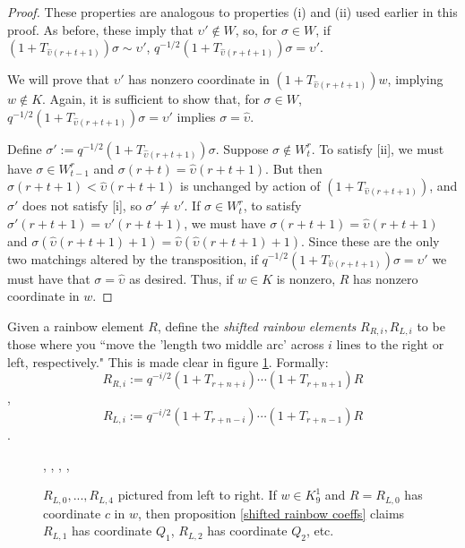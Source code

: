 \documentclass{amsart}
\begin{document}
\begin{proof}
	These properties are analogous to properties (i) and (ii) used earlier in this proof. As before, these imply that $\upsilon'\not\in W$, so, for $\sigma\in W$, if $(1+T_{\widehat{\upsilon}(r+t+1)})\sigma\sim \upsilon'$, $q^{-1/2}(1+T_{\widehat{\upsilon}(r+t+1)})\sigma=\upsilon'$.
	
	We will prove that $\upsilon'$ has nonzero coordinate in $(1+T_{\widehat{\upsilon}(r+t+1)})w$, implying $w\not\in K$. Again, it is sufficient to show that, for $\sigma\in W$, $q^{-1/2}(1+T_{\widehat{\upsilon}(r+t+1)})\sigma=\upsilon'$ implies $\sigma=\widehat{\upsilon}$.
	
	Define $\sigma':=q^{-1/2}(1+T_{\widehat{\upsilon}(r+t+1)})\sigma$. Suppose $\sigma\not\in W^r_t$. To satisfy [ii], we must have $\sigma\in W^r_{t-1}$ and $\sigma(r+t)=\widehat{\upsilon}(r+t+1)$. But then $\sigma(r+t+1)<\widehat{\upsilon}(r+t+1)$ is unchanged by action of $(1+T_{\widehat{\upsilon}(r+t+1)})$, and $\sigma'$ does not satisfy [i], so $\sigma'\not=\upsilon'$. If $\sigma\in W^r_t$, to satisfy $\sigma'(r+t+1)=\upsilon'(r+t+1)$, we must have $\sigma(r+t+1)=\widehat{\upsilon}(r+t+1)$ and $\sigma(\widehat{\upsilon}(r+t+1)+1)=\widehat{\upsilon}(\widehat{\upsilon}(r+t+1)+1)$. Since these are the only two matchings altered by the transposition, if $q^{-1/2}(1+T_{\widehat{\upsilon}(r+t+1)})\sigma=\upsilon'$ we must have that $\sigma=\widehat{\upsilon}$ as desired. Thus, if $w\in K$ is nonzero, $R$ has nonzero coordinate in $w$.
\end{proof}

\vspace{3mm}
\begin{definition}
	Given a rainbow element $R$, define the \emph{shifted rainbow elements} $R_{R,i},R_{L,i}$ to be those where you ``move the 'length two middle arc' across $i$ lines to the right or left, respectively." This is made clear in figure \ref{shifted rainbow}. Formally: $$R_{R,i}:=q^{-i/2}(1+T_{r+n+i})\cdots(1+T_{r+n+1})R$$, $$R_{L,i}:=q^{-i/2}(1+T_{r+n-i})\cdots(1+T_{r+n-1})R$$.
\end{definition}

\begin{figure}
	\def\cbasisspacing{2mm}
	\begin{adjustbox}{width=\textwidth}
		, \hspace{\cbasisspacing}
		, \hspace{\cbasisspacing}
		, \hspace{\cbasisspacing}
		, \hspace{\cbasisspacing}
	\end{adjustbox}
	\caption{$R_{L,0},...,R_{L,4}$ pictured from left to right. If $w\in K_{9}^1$ and $R=R_{L,0}$ has coordinate $c$ in $w$, then proposition \ref{shifted rainbow coeffs} claims $R_{L,1}$ has coordinate $Q_1$, $R_{L,2}$ has coordinate $Q_2$, etc.}
	\label{shifted rainbow}
\end{figure}
\end{document}
